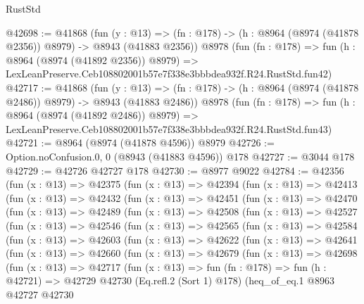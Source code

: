 \begin{lexlean}{RustStd}
\begin{coremodule}
@42698 := @41868
    (fun (y : @13) =>
    (fn : @178) -> (h : @8964 (@8974 (@41878 @2356)) @8979) -> @8943 (@41883 @2356))
    @8978
    (fun (fn : @178) =>
    fun (h : @8964 (@8974 (@41892 @2356)) @8979) =>
    LexLeanPreserve.Ceb108802001b57e7f338e3bbbdea932f.R24.RustStd.fun42)
@42717 := @41868
    (fun (y : @13) =>
    (fn : @178) -> (h : @8964 (@8974 (@41878 @2486)) @8979) -> @8943 (@41883 @2486))
    @8978
    (fun (fn : @178) =>
    fun (h : @8964 (@8974 (@41892 @2486)) @8979) =>
    LexLeanPreserve.Ceb108802001b57e7f338e3bbbdea932f.R24.RustStd.fun43)
@42721 := @8964 (@8974 (@41878 @4596)) @8979
@42726 := Option.noConfusion.{0, 0} (@8943 (@41883 @4596)) @178
@42727 := @3044 @178
@42729 := @42726 @42727 @178
@42730 := @8977 @9022
@42784 := @42356
    (fun (x : @13) =>
    @42375
      (fun (x : @13) =>
      @42394
        (fun (x : @13) =>
        @42413
          (fun (x : @13) =>
          @42432
            (fun (x : @13) =>
            @42451
              (fun (x : @13) =>
              @42470
                (fun (x : @13) =>
                @42489
                  (fun (x : @13) =>
                  @42508
                    (fun (x : @13) =>
                    @42527
                      (fun (x : @13) =>
                      @42546
                        (fun (x : @13) =>
                        @42565
                          (fun (x : @13) =>
                          @42584
                            (fun (x : @13) =>
                            @42603
                              (fun (x : @13) =>
                              @42622
                                (fun (x : @13) =>
                                @42641
                                  (fun (x : @13) =>
                                  @42660
                                    (fun (x : @13) =>
                                    @42679
                                      (fun (x : @13) =>
                                      @42698
                                        (fun (x : @13) =>
                                        @42717
                                          (fun (x : @13) =>
                                          fun (fn : @178) =>
                                          fun (h : @42721) =>
                                          @42729
                                            @42730
                                            (Eq.refl.{2} (Sort 1) @178)
                                            (heq_of_eq.{1}
                                              @8963
                                              @42727
                                              @42730

\end{coremodule}
\end{lexlean}
